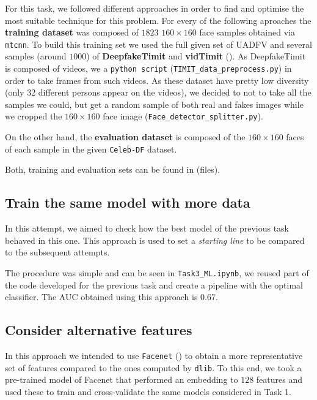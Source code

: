 \documentclass[11pt]{article}
\begin{document}
For this task, we followed different approaches in order to find and optimise the most suitable technique for this problem. For every of the following aproaches the \textbf{training dataset} was composed of \( 1823 \) \( 160\times 160 \) face samples obtained via \texttt{mtcnn}. To build this training set we used the full given set of UADFV and several samples (around \( 1000 \)) of \textbf{DeepfakeTimit} and \textbf{vidTimit} (\cite{sanderson2009multi}). As DeepfakeTimit is composed of videos, we a \texttt{python script} (\texttt{TIMIT\_data\_preprocess.py}) in order to take frames from such videos. As these dataset have pretty low diversity (only 32 different persons appear on the videos), we decided to not to take all the samples we could, but get a random sample of both real and fakes images while we cropped the \( 160 \times 160 \) face image (\texttt{Face\_detector\_splitter.py}).

On the other hand, the \textbf{evaluation dataset} is composed of the \( 160 \times 160 \) faces of each sample in the given \texttt{Celeb-DF} dataset. 

Both, training and evaluation sets can be found in (files).

\subsection*{Train the same model with more data}

In this attempt, we aimed to check how the best model of the previous task behaved in this one. This approach is used to set a \emph{starting line} to be compared to the subsequent attempts.

The procedure was simple and can be seen in \texttt{Task3\_ML.ipynb}, we reused part of the code developed for the previous task and create a pipeline with the optimal classifier. The AUC obtained using this approach is 0.67.

\subsection*{Consider alternative features}

In this approach we intended to use \texttt{Facenet} (\cite{Schroff_2015}) to obtain a more representative set of features compared to the ones computed by \texttt{dlib}. To this end, we took a pre-trained model of Facenet that performed an embedding to \( 128 \) features and used these to train and cross-validate the same models considered in Task 1.
\end{document}
